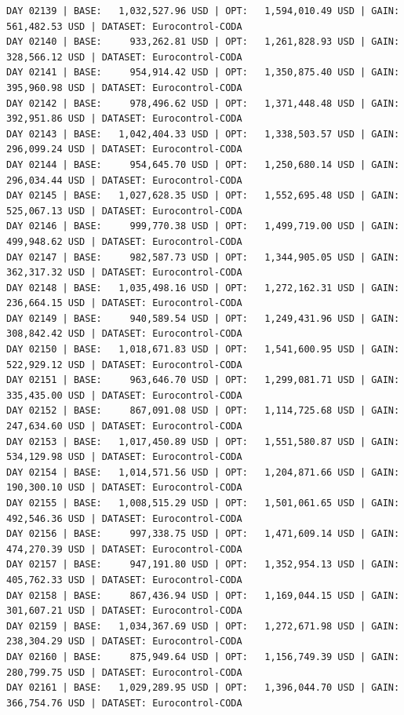 \documentclass[11pt,a4paper]{article}
\begin{document}
\begin{verbatim}
DAY 02139 | BASE:   1,032,527.96 USD | OPT:   1,594,010.49 USD | GAIN: 561,482.53 USD | DATASET: Eurocontrol-CODA
DAY 02140 | BASE:     933,262.81 USD | OPT:   1,261,828.93 USD | GAIN: 328,566.12 USD | DATASET: Eurocontrol-CODA
DAY 02141 | BASE:     954,914.42 USD | OPT:   1,350,875.40 USD | GAIN: 395,960.98 USD | DATASET: Eurocontrol-CODA
DAY 02142 | BASE:     978,496.62 USD | OPT:   1,371,448.48 USD | GAIN: 392,951.86 USD | DATASET: Eurocontrol-CODA
DAY 02143 | BASE:   1,042,404.33 USD | OPT:   1,338,503.57 USD | GAIN: 296,099.24 USD | DATASET: Eurocontrol-CODA
DAY 02144 | BASE:     954,645.70 USD | OPT:   1,250,680.14 USD | GAIN: 296,034.44 USD | DATASET: Eurocontrol-CODA
DAY 02145 | BASE:   1,027,628.35 USD | OPT:   1,552,695.48 USD | GAIN: 525,067.13 USD | DATASET: Eurocontrol-CODA
DAY 02146 | BASE:     999,770.38 USD | OPT:   1,499,719.00 USD | GAIN: 499,948.62 USD | DATASET: Eurocontrol-CODA
DAY 02147 | BASE:     982,587.73 USD | OPT:   1,344,905.05 USD | GAIN: 362,317.32 USD | DATASET: Eurocontrol-CODA
DAY 02148 | BASE:   1,035,498.16 USD | OPT:   1,272,162.31 USD | GAIN: 236,664.15 USD | DATASET: Eurocontrol-CODA
DAY 02149 | BASE:     940,589.54 USD | OPT:   1,249,431.96 USD | GAIN: 308,842.42 USD | DATASET: Eurocontrol-CODA
DAY 02150 | BASE:   1,018,671.83 USD | OPT:   1,541,600.95 USD | GAIN: 522,929.12 USD | DATASET: Eurocontrol-CODA
DAY 02151 | BASE:     963,646.70 USD | OPT:   1,299,081.71 USD | GAIN: 335,435.00 USD | DATASET: Eurocontrol-CODA
DAY 02152 | BASE:     867,091.08 USD | OPT:   1,114,725.68 USD | GAIN: 247,634.60 USD | DATASET: Eurocontrol-CODA
DAY 02153 | BASE:   1,017,450.89 USD | OPT:   1,551,580.87 USD | GAIN: 534,129.98 USD | DATASET: Eurocontrol-CODA
DAY 02154 | BASE:   1,014,571.56 USD | OPT:   1,204,871.66 USD | GAIN: 190,300.10 USD | DATASET: Eurocontrol-CODA
DAY 02155 | BASE:   1,008,515.29 USD | OPT:   1,501,061.65 USD | GAIN: 492,546.36 USD | DATASET: Eurocontrol-CODA
DAY 02156 | BASE:     997,338.75 USD | OPT:   1,471,609.14 USD | GAIN: 474,270.39 USD | DATASET: Eurocontrol-CODA
DAY 02157 | BASE:     947,191.80 USD | OPT:   1,352,954.13 USD | GAIN: 405,762.33 USD | DATASET: Eurocontrol-CODA
DAY 02158 | BASE:     867,436.94 USD | OPT:   1,169,044.15 USD | GAIN: 301,607.21 USD | DATASET: Eurocontrol-CODA
DAY 02159 | BASE:   1,034,367.69 USD | OPT:   1,272,671.98 USD | GAIN: 238,304.29 USD | DATASET: Eurocontrol-CODA
DAY 02160 | BASE:     875,949.64 USD | OPT:   1,156,749.39 USD | GAIN: 280,799.75 USD | DATASET: Eurocontrol-CODA
DAY 02161 | BASE:   1,029,289.95 USD | OPT:   1,396,044.70 USD | GAIN: 366,754.76 USD | DATASET: Eurocontrol-CODA

\end{verbatim}
\end{document}
